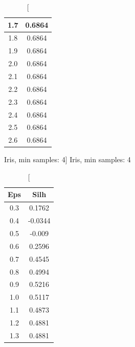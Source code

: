 \documentclass{classrep}
\begin{document}
{{{\begin{table}[!htbp]
\begin{minipage}{.24\textwidth}
\begin{tabular}{|c|c|}
                            1.7 & 0.6864 \\ \hline
                            1.8 & 0.6864 \\ \hline
                            1.9 & 0.6864 \\ \hline
                            2.0 & 0.6864 \\ \hline
                            2.1 & 0.6864 \\ \hline
                            2.2 & 0.6864 \\ \hline
                            2.3 & 0.6864 \\ \hline
                            2.4 & 0.6864 \\ \hline
                            2.5 & 0.6864 \\ \hline
                            2.6 & 0.6864 \\ \hline
                        \end{tabular}
                        \caption
                        [Iris, min samples: 4]
                        {Iris, min samples: 4}
                        \label{db_scan_table_Iris_manh_min_sample4}
                    \end{minipage}
                    \hfill
                    \begin{minipage}{.24\textwidth}
                        \centering
                        \begin{tabular}{|c|c|}
                            \hline
                            Eps & Silh \\ \hline
                            0.3 & 0.1762 \\ \hline
                            0.4 & -0.0344 \\ \hline
                            0.5 & -0.009 \\ \hline
                            0.6 & 0.2596 \\ \hline
                            0.7 & 0.4545 \\ \hline
                            0.8 & 0.4994 \\ \hline
                            0.9 & 0.5216 \\ \hline
                            1.0 & 0.5117 \\ \hline
                            1.1 & 0.4873 \\ \hline
                            1.2 & 0.4881 \\ \hline
                            1.3 & 0.4881 \\ \hline

\end{tabular}
\end{minipage}
\end{table}}}}
\end{document}

